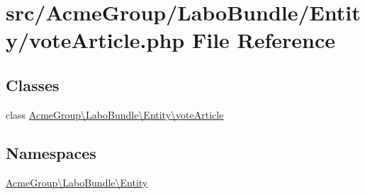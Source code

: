 \hypertarget{vote_article_8php}{\section{src/\+Acme\+Group/\+Labo\+Bundle/\+Entity/vote\+Article.php File Reference}
\label{vote_article_8php}
}
\subsection*{Classes}
\begin{DoxyCompactItemize}
\item 
class \hyperlink{class_acme_group_1_1_labo_bundle_1_1_entity_1_1vote_article}{Acme\+Group\textbackslash{}\+Labo\+Bundle\textbackslash{}\+Entity\textbackslash{}vote\+Article}
\end{DoxyCompactItemize}
\subsection*{Namespaces}
\begin{DoxyCompactItemize}
\item 
 \hyperlink{namespace_acme_group_1_1_labo_bundle_1_1_entity}{Acme\+Group\textbackslash{}\+Labo\+Bundle\textbackslash{}\+Entity}
\end{DoxyCompactItemize}

